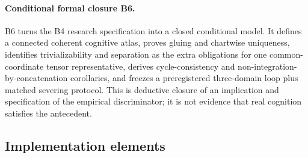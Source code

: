 \documentclass[10pt,twocolumn]{article}
\theoremstyle{definition}
\theoremstyle{plain}
\theoremstyle{remark}
\newcommand{\formalclosure}{\textsf{B6}}
\begin{document}
\paragraph{Conditional formal closure \formalclosure.}
B6 turns the B4 research specification into a closed conditional model.  It defines a connected coherent cognitive atlas, proves gluing and chartwise uniqueness, identifies trivializability and separation as the extra obligations for one common-coordinate tensor representative, derives cycle-consistency and non-integration-by-concatenation corollaries, and freezes a preregistered three-domain loop plus matched severing protocol.  This is deductive closure of an implication and specification of the empirical discriminator; it is not evidence that real cognition satisfies the antecedent.

\subsection{Implementation elements}
\end{document}
